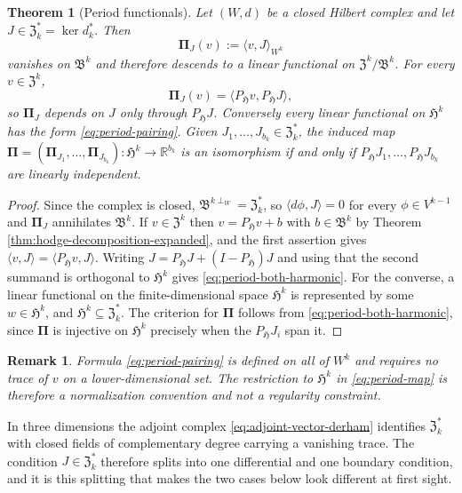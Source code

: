 \documentclass{article}
\newtheorem{theorem}{Theorem}[section]
\newtheorem{remark}{Remark}[section]
\newcommand{\f}[1]{\mathfrak{#1}}
\newcommand{\R} {\mathbb R}
\newcommand{\HH}{\mathfrak H}
\newcommand{\Piop}{\boldsymbol\Pi}
\newcommand{\ip}[2]{\langle #1,#2\rangle}
\begin{document}
\begin{theorem}[Period functionals]\label{thm:period-pairing}
Let $(W,d)$ be a closed Hilbert complex and let $J\in\f Z^{*}_{k}=\ker d^{*}_{k}$.
Then
\begin{equation}\label{eq:period-pairing}
 \Piop_J(v):=\ip{v}{J}_{W^k}
\end{equation}
vanishes on $\f B^{k}$ and therefore descends to a linear functional on
$\f Z^{k}/\f B^{k}$. For every $v\in\f Z^{k}$,
\begin{equation}\label{eq:period-both-harmonic}
 \Piop_J(v)=\ip{P_{\HH}v}{P_{\HH}J},
\end{equation}
so $\Piop_J$ depends on $J$ only through $P_{\HH}J$. Conversely every linear
functional on $\HH^{k}$ has the form \eqref{eq:period-pairing}. Given
$J_1,\dots,J_{b_k}\in\f Z^{*}_{k}$, the induced map
$\Piop=(\Piop_{J_1},\dots,\Piop_{J_{b_k}}):\HH^{k}\to\R^{b_k}$ is an
isomorphism if and only if $P_{\HH}J_1,\dots,P_{\HH}J_{b_k}$ are linearly
independent.
\end{theorem}

\begin{proof}
Since the complex is closed, $\f B^{k\perp_W}=\f Z^{*}_{k}$, so
$\ip{d\phi}{J}=0$ for every $\phi\in V^{k-1}$ and $\Piop_J$ annihilates
$\f B^{k}$. If $v\in\f Z^{k}$ then $v=P_{\HH}v+b$ with $b\in\f B^{k}$ by
Theorem \ref{thm:hodge-decomposition-expanded}, and the first assertion gives
$\ip{v}{J}=\ip{P_{\HH}v}{J}$. Writing $J=P_{\HH}J+(I-P_{\HH})J$ and using that
the second summand is orthogonal to $\HH^{k}$ gives
\eqref{eq:period-both-harmonic}. For the converse, a linear functional on the
finite-dimensional space $\HH^{k}$ is represented by some $w\in\HH^{k}$, and
$\HH^{k}\subseteq\f Z^{*}_{k}$. The criterion for $\Piop$ follows from
\eqref{eq:period-both-harmonic}, since $\Piop$ is injective on $\HH^{k}$
precisely when the $P_{\HH}J_i$ span it.
\end{proof}

\begin{remark}
Formula \eqref{eq:period-pairing} is defined on all of $W^{k}$ and requires no
trace of $v$ on a lower-dimensional set. The restriction to $\HH^{k}$ in
\eqref{eq:period-map} is therefore a normalization convention and not a
regularity constraint.
\end{remark}
In three dimensions the adjoint complex \eqref{eq:adjoint-vector-derham} identifies
$\f Z^{*}_{k}$ with closed fields of complementary degree carrying a vanishing
trace. The condition $J\in\f Z^{*}_{k}$ therefore splits into one differential
and one boundary condition, and it is this splitting that makes the two cases
below look different at first sight.
\end{document}

